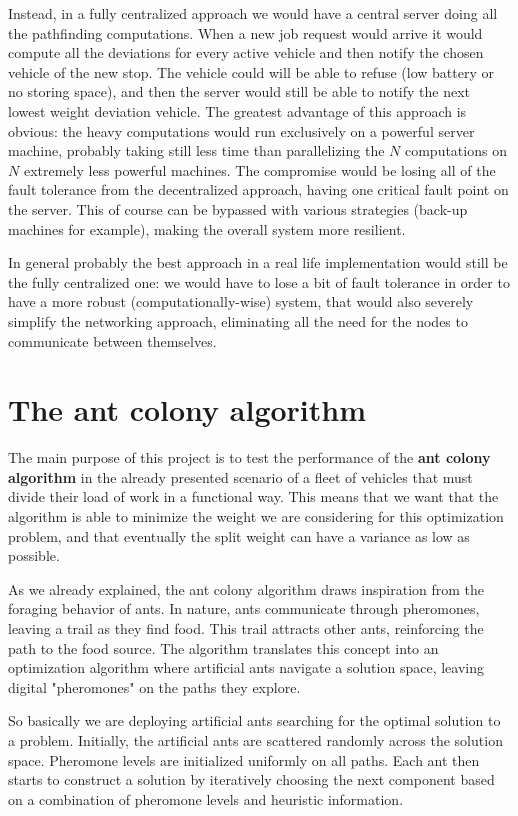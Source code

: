 \documentclass[titlepage]{article}
\begin{document}
Instead, in a fully centralized approach we would have a central server doing all the pathfinding computations. When a new job request would arrive it would compute all the deviations for every active vehicle and then notify the chosen vehicle of the new stop. The vehicle could will be able to refuse (low battery or no storing space), and then the server would still be able to notify the next lowest weight deviation vehicle. The greatest advantage of this approach is obvious: the heavy computations would run exclusively on a powerful server machine, probably taking still less time than parallelizing the $N$ computations on $N$ extremely less powerful machines. The compromise would be losing all of the fault tolerance from the decentralized approach, having one critical fault point on the server. This of course can be bypassed with various strategies (back-up machines for example), making the overall system more resilient.

In general probably the best approach in a real life implementation would still be the fully centralized one: we would have to lose a bit of fault tolerance in order to have a more robust (computationally-wise) system, that would also severely simplify the networking approach, eliminating all the need for the nodes to communicate between themselves.

\section{The ant colony algorithm}
The main purpose of this project is to test the performance of the \textbf{ant colony algorithm} in the already presented scenario of a fleet of vehicles that must divide their load of work in a functional way. This means that we want that the algorithm is able to minimize the weight we are considering for this optimization problem, and that eventually the split weight can have a variance as low as possible.

As we already explained, the ant colony algorithm draws inspiration from the foraging behavior of ants. In nature, ants communicate through pheromones, leaving a trail as they find food. This trail attracts other ants, reinforcing the path to the food source. The algorithm translates this concept into an optimization algorithm where artificial ants navigate a solution space, leaving digital "pheromones" on the paths they explore.

So basically we are deploying artificial ants searching for the optimal solution to a problem. Initially, the artificial ants are scattered randomly across the solution space. Pheromone levels are initialized uniformly on all paths. Each ant then starts to construct a solution by iteratively choosing the next component based on a combination of pheromone levels and heuristic information.
\end{document}
